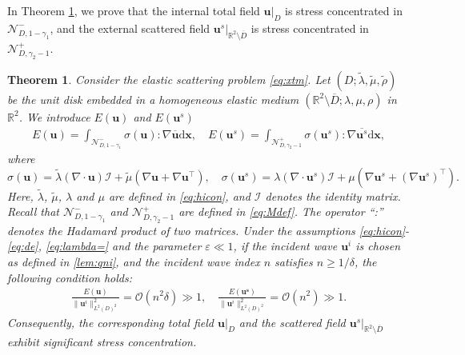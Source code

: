 \documentclass[11pt,reqno,twoside]{amsart}
\newtheorem{thm}{Theorem}[section]
\theoremstyle{definition}
\theoremstyle{remark}
\numberwithin{equation}{section}
\newcommand{\bu}{\mathbf{u}}
\newcommand{\bx}{\mathbf{x}}
\begin{document}
			In  Theorem \ref{thm:eu}, we prove that the internal total field $\mathbf {u}|_D$ is stress concentrated in $\mathcal{N}_{D,1-\gamma_{1}}^{-}$, and the external scattered field $\mathbf u^s|_{\mathbb R^2\setminus\overline D} $ is stress concentrated in $\mathcal{N}_{D,\gamma_{2}-1}^{+} $.
			\begin{thm}\label{thm:eu}
				Consider the elastic scattering problem \eqref{eq:xtm}. Let $(D;\tilde{\lambda},\tilde{\mu},\tilde{\rho})$ be the unit disk embedded in a homogeneous elastic medium $(\mathbb{R}^2\setminus\overline{D};\lambda,\mu,\rho)$ in $\mathbb{R}^2$. We introduce $E(\bu)$ and $E(\bu^s)$ 
				\begin{align}\label{eq:eueus}
					E(\mathbf{u})=\int_{\mathcal{N}_{D,1-\gamma_{1}}^{-}}\sigma(\mathbf{u}):\nabla\overline{\mathbf{u}}\mathrm{d}\bx,\quad E(\mathbf{u}^s)=\int_{\mathcal{N}_{D,\gamma_{2}-1}^{+}}\sigma(\mathbf{u}^s):\nabla\overline{\mathbf{u}^s}\mathrm{d}\bx,
				\end{align}
				where
				\[\sigma(\mathbf{u})=\tilde{\lambda}(\nabla\cdot\mathbf{u})\mathcal{I}+\tilde{\mu}\left(\nabla\mathbf{u}+\nabla\mathbf{u}^\top\right),\quad\sigma(\mathbf{u}^s)=\lambda(\nabla\cdot\mathbf{u}^s)\mathcal{I}+\mu\left(\nabla\mathbf{u}^s+(\nabla\mathbf{u}^s)^\top\right).\]
				Here, \(\tilde{\lambda}\), \(\tilde{\mu}\), $\lambda$ and $\mu$ are defined in \eqref{eq:hicon}, and \(\mathcal{I}\) denotes the identity matrix. Recall that $\mathcal{N}_{D,1-\gamma_{1}}^{-}$ and $\mathcal{N}_{D,\gamma_{2}-1}^{+}$ are defined in  \eqref{eq:Mdef}. The operator “:” denotes the Hadamard product of two matrices. Under the assumptions \eqref{eq:hicon}-\eqref{eq:de}, \eqref{eq:lambda=} and the parameter \(\varepsilon \ll 1\), if the incident wave $\bu^i$ is chosen as defined in \eqref{lem:qni}, and  the incident wave index $n$ satisfies $n \geq  1/\delta$,
				the following condition holds:
				\begin{align}\label{eq:eug}
					\frac{E(\bu)}{\|{\bu}^i\|_{L^2(D)^2}^2} = \mathcal{O}\left(n^2\delta\right) \gg 1,  \quad
					\frac{E(\mathbf{u^{s}})}{\|\bu^i\|_{L^2(D)^2}^2} = \mathcal{O}\left(n^2\right) \gg 1.
				\end{align}
				Consequently, the corresponding total field $\mathbf{u}|_D$ and the scattered field $\mathbf u^s|_{\mathbb R^2\setminus\overline D}$ exhibit significant stress concentration.
			\end{thm}
\end{document}
